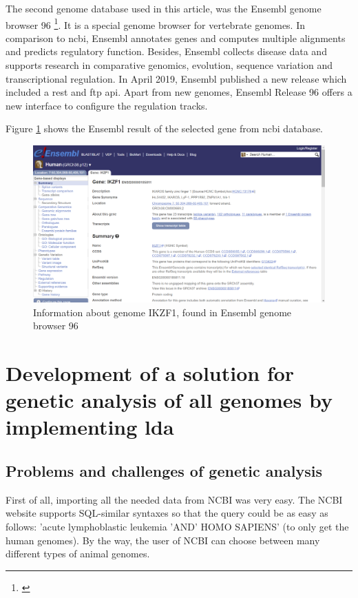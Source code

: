 The second genome database used in this article, was the Ensembl genome browser 96 \footnote{\autocite{ensembl}}. It is a special genome browser for vertebrate genomes. In comparison to \gls{ncbi}, Ensembl annotates genes and computes multiple alignments and predicts regulatory function. Besides, Ensembl collects disease data and supports research in comparative genomics, evolution, sequence variation and transcriptional regulation.
In April 2019, Ensembl published a new release which included a \gls{rest} and \gls{ftp} \gls{api}. Apart from new genomes, Ensembl Release 96 offers a new interface to configure the regulation tracks.

Figure \ref{ensembl_result} shows the Ensembl result of the selected gene from \gls{ncbi} database.

\begin{figure}[htbp]
	\centering
	\includegraphics[width=1\textwidth]{Image/ensembl_ikzf1.png}
	\caption{Information about genome IKZF1, found in Ensembl genome browser 96}
	\label{ensembl_result}
\end{figure}

\chapter{Development of a solution for genetic analysis of \gls{all} genomes by implementing \gls{lda}}\label{development}
\section{Problems and challenges of genetic analysis}\label{problems_challenges}

First of all, importing all the needed data from NCBI was very easy. The NCBI website supports SQL-similar syntaxes so that the query could be as easy as follows: 'acute lymphoblastic leukemia 'AND' HOMO SAPIENS' (to only get the human genomes). By the way, the user of NCBI can choose between many different types of animal genomes.

